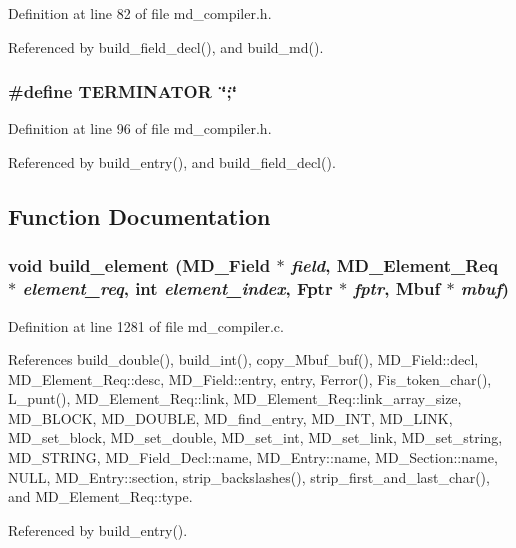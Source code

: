 Definition at line 82 of file md\_\-compiler.h.

Referenced by build\_\-field\_\-decl(), and build\_\-md().
\subsubsection{\setlength{\rightskip}{0pt plus 5cm}\#define TERMINATOR~\char`\"{};\char`\"{}}\label{md__compiler_8h_9957e6bff526d6cefef9b0b4eb1c6501}




Definition at line 96 of file md\_\-compiler.h.

Referenced by build\_\-entry(), and build\_\-field\_\-decl().

\subsection{Function Documentation}
\subsubsection{\setlength{\rightskip}{0pt plus 5cm}void build\_\-element (\bf{MD\_\-Field} $\ast$ {\em field}, \bf{MD\_\-Element\_\-Req} $\ast$ {\em element\_\-req}, int {\em element\_\-index}, \bf{Fptr} $\ast$ {\em fptr}, \bf{Mbuf} $\ast$ {\em mbuf})}\label{md__compiler_8h_de61fda8263e72bad493eade04a924c8}




Definition at line 1281 of file md\_\-compiler.c.

References build\_\-double(), build\_\-int(), copy\_\-Mbuf\_\-buf(), MD\_\-Field::decl, MD\_\-Element\_\-Req::desc, MD\_\-Field::entry, entry, Ferror(), Fis\_\-token\_\-char(), L\_\-punt(), MD\_\-Element\_\-Req::link, MD\_\-Element\_\-Req::link\_\-array\_\-size, MD\_\-BLOCK, MD\_\-DOUBLE, MD\_\-find\_\-entry, MD\_\-INT, MD\_\-LINK, MD\_\-set\_\-block, MD\_\-set\_\-double, MD\_\-set\_\-int, MD\_\-set\_\-link, MD\_\-set\_\-string, MD\_\-STRING, MD\_\-Field\_\-Decl::name, MD\_\-Entry::name, MD\_\-Section::name, NULL, MD\_\-Entry::section, strip\_\-backslashes(), strip\_\-first\_\-and\_\-last\_\-char(), and MD\_\-Element\_\-Req::type.

Referenced by build\_\-entry().
